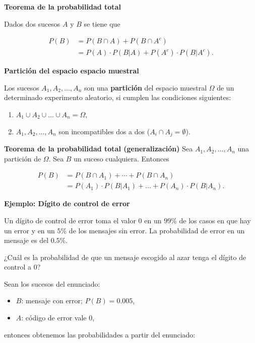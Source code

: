 \documentclass[]{book}
\providecommand{\tightlist}{%
  \setlength{\itemsep}{0pt}\setlength{\parskip}{0pt}}
\begin{document}
\textbf{Teorema de la probabilidad total}

Dados dos sucesos \(A\) y \(B\) se tiene que

\[
\begin{array}{rl}
P(B)&= P(B\cap A) +P(B\cap A^c)\\
& =P(A)\cdot P(B|A)+ P(A^c)\cdot P(B|A^c).
\end{array}
\]

\textbf{Partición del espacio espacio muestral}

Los sucesos \(A_1,A_2,\ldots, A_n\) son una \textbf{partición} del espacio muestral \(\Omega\) de un determinado experimento aleatorio, si cumplen las condiciones siguientes:

\begin{enumerate}
\def\labelenumi{\arabic{enumi}.}
\tightlist
\item
  \(A_1\cup A_2\cup\ldots\cup A_n=\Omega\),
\item
  \(A_1,A_2,\ldots,A_n\) son incompatibles dos a dos (\(A_i\cap A_j=\emptyset\)).
\end{enumerate}

\textbf{Teorema de la probabilidad total (generalización)}
Sea \(A_1,A_2,\ldots,A_n\) una partición de \(\Omega\). Sea \(B\) un suceso cualquiera. Entonces

\[
\begin{array}{rl}
P(B)&= P(B\cap A_1)+\cdots +P(B\cap A_n)\\
& =P(A_1)\cdot P(B|A_1)+\ldots+P(A_n)\cdot P(B|A_n).
\end{array}
\]

\textbf{Ejemplo: Dígito de control de error}

Un dígito de control de error toma el valor 0 en un \(99\%\) de los casos en que hay un error y en un \(5\%\) de los mensajes sin error.
La probabilidad de error en un mensaje es del \(0.5\%\).

¿Cuál es la probabilidad de que un mensaje escogido al azar tenga el dígito de control a 0?

Sean los sucesos del enunciado:

\begin{itemize}
\tightlist
\item
  \(B\): mensaje con error; \(P(B)=0.005\),
\item
  \(A\): código de error vale 0,
\end{itemize}

entonces obtenemos las probabilidades a partir del enunciado:
\end{document}
